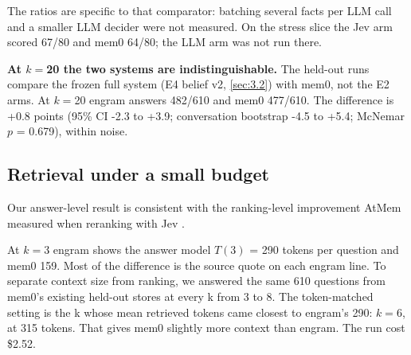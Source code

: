 \documentclass[11pt]{article}
\newcommand{\src}[1]{}
\begin{document}
The ratios are specific to that comparator: batching several facts per LLM call and a smaller LLM decider were not measured. On the stress slice the Jev arm scored 67/80\src{bench/results/e2\_jev\_\_stress.json} and mem0 64/80\src{bench/results/mem0\_\_stress.json}; the LLM arm was not run there.

\textbf{At $k{=}$20 the two systems are indistinguishable.} The held-out runs compare the frozen full system (E4 belief v2, \cref{sec:3.2}) with mem0, not the E2 arms. At $k{=}$20 engram answers 482/610\src{bench/results/heldout\_report.json} and mem0 477/610\src{bench/results/heldout\_report.json}. The difference is +0.8\src{bench/results/heldout\_report.json} points (95\% CI -2.3\src{bench/results/heldout\_report.json} to +3.9\src{bench/results/heldout\_report.json}; conversation bootstrap -4.5\src{bench/results/heldout\_report.json} to +5.4\src{bench/results/heldout\_report.json}; McNemar $p$ = 0.679\src{bench/results/heldout\_report.json}), within noise.

\subsection{Retrieval under a small budget}\label{sec:5.2}
Our answer-level result is consistent with the ranking-level improvement AtMem measured when reranking with Jev \citep{taghia2026atmem}.

At $k{=}$3 engram shows the answer model $T(3)$ = 290\src{bench/results/heldout\_report.json} tokens per question and mem0 159\src{bench/results/heldout\_report.json}. Most of the difference is the source quote on each engram line. To separate context size from ranking, we answered the same 610\src{bench/results/heldout\_report.json} questions from mem0's existing held-out stores at every k from 3 to 8. The token-matched setting is the k whose mean retrieved tokens came closest to engram's 290\src{bench/results/mem0\_token\_matched\_\_heldout\_pooled\_\_k6.json}: $k{=}$6\src{bench/results/mem0\_token\_matched\_\_heldout\_pooled\_\_k6.json}, at 315\src{bench/results/mem0\_token\_matched\_\_heldout\_pooled\_\_k6.json} tokens. That gives mem0 slightly more context than engram. The run cost \$2.52\src{bench/results/mem0\_token\_matched\_\_heldout\_pooled\_\_k6.json}.
\end{document}

